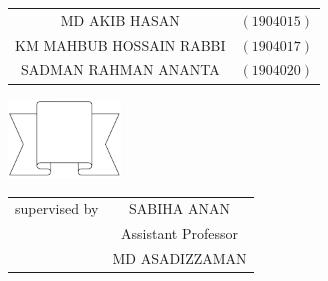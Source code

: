 \documentclass[a4paper,11pt]{report}
\begin{document}
\begin{titlepage}
{		\begin{tabular}{cl}
			MD AKIB HASAN           & $(1904015)$ \\
			KM MAHBUB HOSSAIN RABBI & $(1904017)$ \\
			SADMAN RAHMAN ANANTA    & $(1904020)$ \\
		\end{tabular}
	}
	\parbox[r]{8cm}{
		\vspace{.5cm}
		\begin{center}
			\includegraphics[width=3cm, keepaspectratio]{remarks.png}
		\end{center}
	}

	\vspace{2cm}
	\begin{tabular}{cc}
		supervised by & SABIHA ANAN         \\
		              & Assistant Professor \\
		              & MD ASADIZZAMAN
	\end{tabular}

	\vfill
\end{titlepage}
\end{document}
